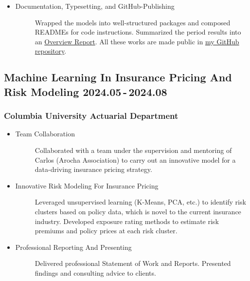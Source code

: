 \documentclass[a4paper]{article}
\newcommand{\MFG}{\href{https://github.com/OrangeAoo/Multi-Period-Compliance-MFG-FBSDEs}{my GitHub repository}}
\begin{document}
\begin{itemize}
\begin{description}
    \end{description}
    \item \begin{description}
        \item[Documentation, Typesetting, and GitHub-Publishing] Wrapped the models into well-structured packages and composed READMEs for code instructions. Summarized the period results into an \href{https://github.com/OrangeAoo/Multi-Compliance-MFG-FBSDEs/blob/FBSDE/FinalReports/ReportOverview-MFG-FBSDE.pdf}{Overview Report}. All these works are made public in \MFG. %
    \end{description}
\end{itemize}

\hypertarget{integrated-project}{
    \subsection{Machine Learning In Insurance Pricing And Risk Modeling \normalfont \hfill 2024.05\,-\,2024.08} 
}
\subsubsection{Columbia University Actuarial Department} 
\vspace{3pt}
\begin{itemize}
    \item\begin{description}
        \item[Team Collaboration] Collaborated with a team under the supervision and mentoring of Carlos (Arocha Association) to carry out an innovative model for a data-driving insurance pricing strategy.
    \end{description}
    \item\begin{description}
        \item[Innovative Risk Modeling For Insurance Pricing] Leveraged unsupervised learning (K-Means, PCA, etc.) to identify risk clusters based on policy data, which is novel to the current insurance industry. Developed exposure rating methods to estimate risk premiums and policy prices at each risk cluster. 
    \end{description}
    \item\begin{description}
        \item[Professional Reporting And Presenting] Delivered professional Statement of Work and Reports. Presented findings and consulting advice to clients.
    \end{description}
\end{itemize} 
\end{document}
